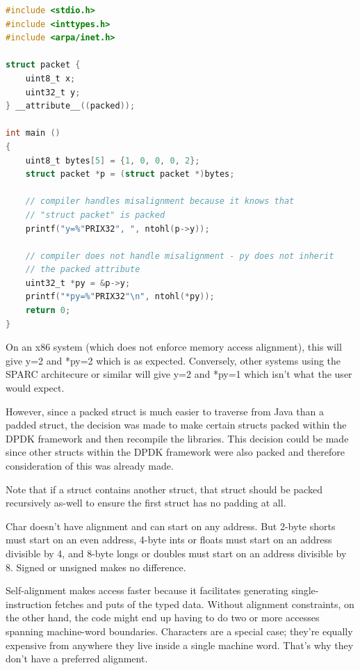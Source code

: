\documentclass[final_report.tex]{subfiles}
\begin{document}
\begin{lstlisting}[language=C, caption={Example C Struct with compiler inserted padding}, label=lst:c_padded_struct]
#include <stdio.h>
#include <inttypes.h>
#include <arpa/inet.h>

struct packet {
    uint8_t x;
    uint32_t y;
} __attribute__((packed));

int main ()
{
    uint8_t bytes[5] = {1, 0, 0, 0, 2};
    struct packet *p = (struct packet *)bytes;

    // compiler handles misalignment because it knows that
    // "struct packet" is packed
    printf("y=%"PRIX32", ", ntohl(p->y));

    // compiler does not handle misalignment - py does not inherit
    // the packed attribute
    uint32_t *py = &p->y;
    printf("*py=%"PRIX32"\n", ntohl(*py));
    return 0;
}
\end{lstlisting}

On an x86 system (which does not enforce memory access alignment), this will give y=2 and *py=2 which is as expected. Conversely, other systems using the SPARC architecure or similar will give y=2 and *py=1 which isn't what the user would expect.

However, since a packed struct is much easier to traverse from Java than a padded struct, the decision was made to make certain structs packed within the DPDK framework and then recompile the libraries. This decision could be made since other structs within the DPDK framework were also packed and therefore consideration of this was already made.

Note that if a struct contains another struct, that struct should be packed recursively as-well to ensure the first struct has no padding at all.

Char doesn't have alignment and can start on any address. But 2-byte shorts must start on an even address, 4-byte ints or floats must start on an address divisible by 4, and 8-byte longs or doubles must start on an address divisible by 8. Signed or unsigned makes no difference.

Self-alignment makes access faster because it facilitates generating single-instruction fetches and puts of the typed data. Without alignment constraints, on the other hand, the code might end up having to do two or more accesses spanning machine-word boundaries. Characters are a special case; they're equally expensive from anywhere they live inside a single machine word. That's why they don't have a preferred alignment.
\end{document}
